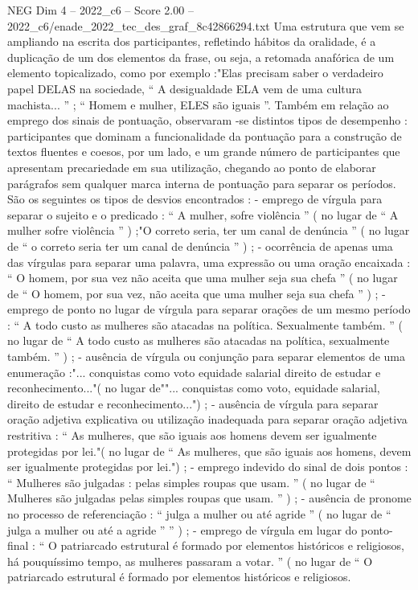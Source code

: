 \begin{textsample}{NEG Dim 4 – 2022\_c6 – Score 2.00 – 2022\_c6/enade\_2022\_tec\_des\_graf\_8c42866294.txt}
Uma estrutura que vem se ampliando na escrita dos participantes, refletindo hábitos da oralidade, é a duplicação de um dos elementos da frase, ou seja, a retomada anafórica de um elemento topicalizado, como por exemplo :"Elas precisam saber o verdadeiro papel DELAS na sociedade, “ A desigualdade ELA vem de uma cultura machista... ” ; “ Homem e mulher, ELES são iguais ”.
Também em relação ao emprego dos sinais de pontuação, observaram -se distintos tipos de desempenho : participantes que dominam a funcionalidade da pontuação para a construção de textos fluentes e coesos, por um lado, e um grande número de participantes que apresentam precariedade em sua utilização, chegando ao ponto de elaborar parágrafos sem qualquer marca interna de pontuação para separar os períodos.
São os seguintes os tipos de desvios encontrados : - emprego de vírgula para separar o sujeito e o predicado : “ A mulher, sofre violência ” ( no lugar de “ A mulher sofre violência ” ) ;"O correto seria, ter um canal de denúncia ” ( no lugar de “ o correto seria ter um canal de denúncia ” ) ; - ocorrência de apenas uma das vírgulas para separar uma palavra, uma expressão ou uma oração encaixada : “ O homem, por sua vez não aceita que uma mulher seja sua chefa ” ( no lugar de “ O homem, por sua vez, não aceita que uma mulher seja sua chefa ” ) ; - emprego de ponto no lugar de vírgula para separar orações de um mesmo período : “ A todo custo as mulheres são atacadas na política.
Sexualmente também. ” ( no lugar de “ A todo custo as mulheres são atacadas na política, sexualmente também. ” ) ; - ausência de vírgula ou conjunção para separar elementos de uma enumeração :"... conquistas como voto equidade salarial direito de estudar e reconhecimento..."( no lugar de""... conquistas como voto, equidade salarial, direito de estudar e reconhecimento...") ; - ausência de vírgula para separar oração adjetiva explicativa ou utilização inadequada para separar oração adjetiva restritiva : “ As mulheres, que são iguais aos homens devem ser igualmente protegidas por lei."( no lugar de “ As mulheres, que são iguais aos homens, devem ser igualmente protegidas por lei.") ; - emprego indevido do sinal de dois pontos : “ Mulheres são julgadas : pelas simples roupas que usam. ” ( no lugar de “ Mulheres são julgadas pelas simples roupas que usam. ” ) ; - ausência de pronome no processo de referenciação : “ julga a mulher ou até agride ” ( no lugar de “ julga a mulher ou até a agride ” ” ) ; - emprego de vírgula em lugar do ponto-final : “ O patriarcado estrutural é formado por elementos históricos e religiosos, há pouquíssimo tempo, as mulheres passaram a votar. ” ( no lugar de “ O patriarcado estrutural é formado por elementos históricos e religiosos.

\end{textsample}

